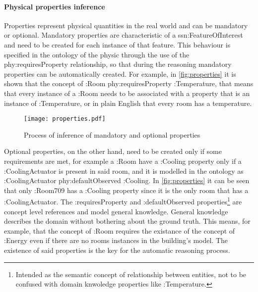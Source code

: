 \paragraph{Physical properties inference}
Properties represent physical quantities in the real world and can be mandatory or optional. Mandatory properties are characteristic of a ssn:FeatureOfInterest and need to be created for each instance of that feature. This behaviour is specified in the ontology of the physic through the use of the phy:requiresProperty relationship, so that during the reasoning mandatory properties can be automatically created. For example, in \autoref{fig:properties} it is shown that the concept of :Room phy:requiresProperty :Temperature, that means that every instance of a :Room needs to be associated with a property that is an instance of :Temperature, or in plain English that every room has a temperature.
\begin{figure}
  \centering
  \texttt{[image: properties.pdf]}
  \caption{Process of inference of mandatory and optional properties}
  \label{fig:properties}
\end{figure}
Optional properties, on the other hand, need to be created only if some requirements are met, for example a :Room have a :Cooling property only if a :CoolingActuator is present in said room, and it is modelled in the ontology as :CoolingActuator phy:defaultObserved :Cooling. In \autoref{fig:properties} it can be seen that only :Room709 has a :Cooling property since it is the only room that has a :CoolingActuator.
The :requiresProperty and :defaultObserved properties\footnote{Intended as the semantic concept of relationship between entities, not to be confused with domain knwoledge properties like :Temperature.} are concept level references and model general knowledge. General knowledge describes the domain without bothering about the ground truth. This means, for example, that the concept of :Room requires the existance of the concept of :Energy even if there are no rooms instances in the building's model. The existence of said properties is the key for the automatic reasoning process.

